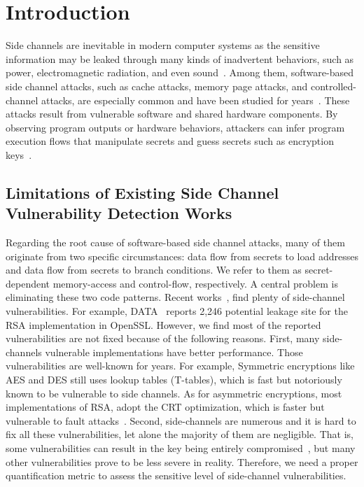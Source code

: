 
\chapter{Introduction} \label{chapter1:introduction}

Side channels are inevitable in modern computer systems as the sensitive
information may be leaked through many kinds of inadvertent behaviors, such as power,
electromagnetic radiation, and even
sound~\cite{agrawal2002side,kar20178,chari1999towards,217605,genkin2014rsa}.
Among them, software-based side channel attacks, such as cache attacks, memory page
attacks, and controlled-channel attacks, are especially common and have been
studied for
years~\cite{7163052,217543,217589,lee2017inferring,191010,liu2015last}. These
attacks result from vulnerable software and shared hardware components.
By observing program outputs or hardware behaviors, attackers can infer program
execution flows that manipulate secrets and guess secrets such as encryption
keys~\cite{Osvik2006,Gullasch:2011:CGB:2006077.2006784,203878,10.1007/978-3-540-45238-6_6}.

\section{Limitations of Existing Side Channel Vulnerability Detection Works}
Regarding the root cause of software-based side channel attacks, many of them originate
from two specific circumstances: data flow from secrets to load
addresses and data flow from secrets to branch conditions. We refer to them as
 secret-dependent memory-access and control-flow, respectively. A
central problem is eliminating these two code patterns. 
Recent
works~\cite{203878,217537,Wichelmann:2018:MFF:3274694.3274741,Brotzman19Casym,236338,182946},
find plenty of side-channel vulnerabilities. For example,
DATA~\cite{217537} reports 2,246 potential leakage site for the RSA
implementation in OpenSSL\@. 
However, we find most of the reported vulnerabilities are not fixed because
of the following reasons.
First, many side-channels vulnerable implementations have better performance.
Those vulnerabilities are well-known for years. For example,
Symmetric encryptions like AES and DES still uses lookup tables (T-tables), which
is fast but notoriously known to be vulnerable to side channels.
As for asymmetric encryptions, most implementations of RSA, adopt the CRT optimization,
which is faster but vulnerable to fault attacks~\cite{aumuller2002fault}.
Second, side-channels are numerous and it is hard to fix all these vulnerabilities,
let alone the majority of them are negligible. 
That is, some vulnerabilities can result in the key being 
entirely compromised~\cite{184415, aumuller2002fault}, but many other vulnerabilities prove to be less
severe in reality. Therefore, we need a proper quantification metric to 
assess the sensitive level of side-channel vulnerabilities.

